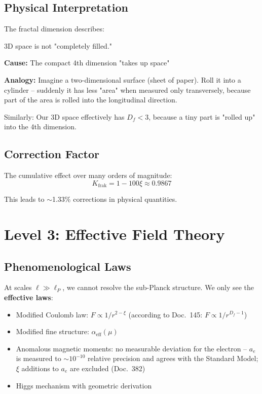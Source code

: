 	\subsection{Physical Interpretation}
	
	The fractal dimension describes:
	
	\begin{philosophical}[Meaning of $D_f < 3$]
		3D space is not "completely filled."
		
		\vspace{0.3cm}
		
		\textbf{Cause:} The compact 4th dimension "takes up space"
		
		\vspace{0.3cm}
		
		\textbf{Analogy:}
		Imagine a two-dimensional surface (sheet of paper). Roll it into a cylinder -- suddenly it has less "area" when measured only transversely, because part of the area is rolled into the longitudinal direction.
		
		Similarly: Our 3D space effectively has $D_f < 3$, because a tiny part is "rolled up" into the 4th dimension.
	\end{philosophical}
	
	\subsection{Correction Factor}
	
	The cumulative effect over many orders of magnitude:
	\begin{equation}
		K_{\text{frak}} = 1 - 100\xi \approx 0.9867
	\end{equation}
	
	This leads to $\sim$1.33\% corrections in physical quantities.
	
	\section{Level 3: Effective Field Theory}
	
	\subsection{Phenomenological Laws}
	
	At scales $\ell \gg \ell_P$, we cannot resolve the sub-Planck structure. We only see the \textbf{effective laws}:
	
	\begin{itemize}
		\item Modified Coulomb law: $F \propto 1/r^{2-\xi}$ (according to Doc.~145: $F \propto 1/r^{D_f-1}$)
		\item Modified fine structure: $\alpha_{\text{eff}}(\mu)$
		\item Anomalous magnetic moments: no measurable deviation for the electron -- $a_e$ is measured to $\sim10^{-10}$ relative precision and agrees with the Standard Model; $\xi$ additions to $a_e$ are excluded (Doc.~382)
		\item Higgs mechanism with geometric derivation
	\end{itemize}
	

